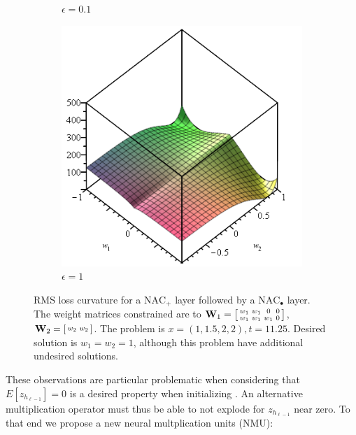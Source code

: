 \begin{figure}[H]
\begin{subfigure}{.33\textwidth}
  \caption{$\epsilon = 0.1$}
\end{subfigure}
\begin{subfigure}{.33\textwidth}
  \centering
  \includegraphics[width=\linewidth]{graphics/nac-mul-eps-1.png}
  \caption{$\epsilon = 1$}
\end{subfigure}
\caption{RMS loss curvature for a $\mathrm{NAC}_{+}$ layer followed by a $\mathrm{NAC}_{\bullet}$ layer. The weight matrices constrained are to $\mathbf{W}_1 = \left[\protect\begin{smallmatrix}
w_1 & w_1 & 0 & 0 \\
w_1 & w_1 & w_1 & 0
\protect\end{smallmatrix}\right]$, $\mathbf{W}_2 = \left[\protect\begin{smallmatrix}
w_2 & w_2
\protect\end{smallmatrix}\right]$. The problem is $x = \left(1, 1.5, 2, 2\right), t = 11.25$. Desired solution is $w_1 = w_2 = 1$, although this problem have additional undesired solutions.}
\label{fig:nac-mul-eps-issue}
\end{figure}

These observations are particular problematic when considering that $E[z_{h_{\ell-1}}] = 0$ is a desired property when initializing \cite{glorot-initialization}. An alternative multiplication operator must thus be able to not explode for $z_{h_{\ell-1}}$ near zero. To that end we propose a new neural multplication units (NMU): 


